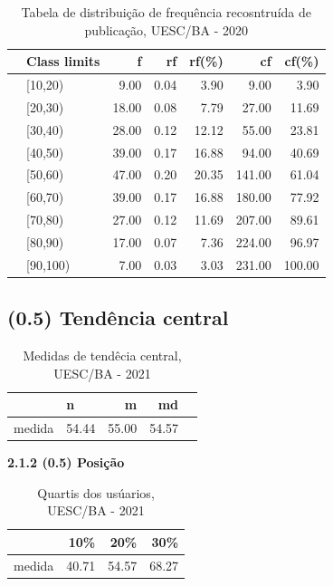 \documentclass[12pt]{article}\usepackage[]{graphicx}\usepackage[]{color}
\begin{document}
 \begin{table}[!ht]
  \centering
  \caption{Tabela de distribuição de frequência recosntruída de publicação, UESC/BA - 2020}
\begin{tabular}{rlrrrrr}
  \toprule
 & Class limits & f & rf & rf(\%) & cf & cf(\%) \\ 
  \midrule& [10,20) & 9.00 & 0.04 & 3.90 & 9.00 & 3.90 \\ 
& [20,30) & 18.00 & 0.08 & 7.79 & 27.00 & 11.69 \\ 
& [30,40) & 28.00 & 0.12 & 12.12 & 55.00 & 23.81 \\ 
& [40,50) & 39.00 & 0.17 & 16.88 & 94.00 & 40.69 \\ 
& [50,60) & 47.00 & 0.20 & 20.35 & 141.00 & 61.04 \\ 
& [60,70) & 39.00 & 0.17 & 16.88 & 180.00 & 77.92 \\ 
& [70,80) & 27.00 & 0.12 & 11.69 & 207.00 & 89.61 \\ 
& [80,90) & 17.00 & 0.07 & 7.36 & 224.00 & 96.97 \\ 
& [90,100) & 7.00 & 0.03 & 3.03 & 231.00 & 100.00 \\  
   \bottomrule
\end{tabular}
  \end{table}

\subsection{(0.5) Tendência central}

\begin{table}[!ht]
  \centering
  \caption{Medidas de tendêcia central, UESC/BA - 2021}
  \begin{tabular}{rlrrr}
  \toprule
 & n & m & md \\ 
  \midrule
 medida & 54.44 & 55.00 & 54.57 \\ 
   \bottomrule
\end{tabular}
\end{table}

\textbf{2.1.2 (0.5) Posição}


\begin{table}[!ht]
  \centering
  \caption{Quartis dos usúarios, UESC/BA - 2021}
  \centering
  \begin{tabular}{rrrr}
  \hline
   & 10\% & 20\% & 30\% \\ 
  \hline
  medida & 40.71 & 54.57 & 68.27 \\ 
   \hline
\end{tabular}
\end{table}
\end{document}
